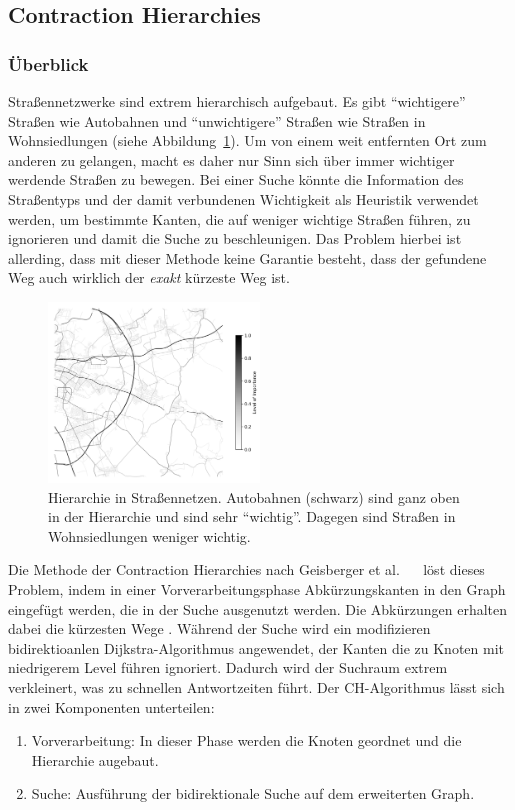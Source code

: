 \subsection{Contraction Hierarchies}
\subsubsection{Überblick}
Straßennetzwerke sind extrem hierarchisch aufgebaut. Es gibt "`wichtigere"' Straßen wie \zB Autobahnen
und "`unwichtigere"' Straßen wie \zB Straßen in Wohnsiedlungen (siehe
Abbildung~\ref{fig:road_hierarchy}). Um von einem weit entfernten Ort zum anderen zu gelangen, macht
es daher nur Sinn sich über immer wichtiger werdende Straßen zu bewegen. Bei einer Suche könnte die
Information des Straßentyps und der damit verbundenen Wichtigkeit als Heuristik verwendet werden, um
bestimmte Kanten, die auf weniger wichtige Straßen führen,  zu ignorieren und damit die Suche zu
beschleunigen. Das Problem hierbei ist allerding, dass mit dieser Methode keine Garantie besteht,
dass der gefundene Weg auch wirklich der \emph{exakt} kürzeste Weg ist.
\begin{figure}[h]
    \centering
    \includegraphics[width=0.5\textwidth]{figures/road_hierarchy.png}
    \caption[Hierarchie in Straßennetzen]{Hierarchie in Straßennetzen. Autobahnen (schwarz) sind
        ganz oben in der Hierarchie und sind sehr "`wichtig"'. Dagegen sind Straßen in
        Wohnsiedlungen weniger wichtig. \osmcr}
    \label{fig:road_hierarchy}
\end{figure}
Die Methode der Contraction Hierarchies nach Geisberger et al.
\cite{geisberger.workshop}~\cite{geisberger.thesis}~\cite{geisberger.exact} löst dieses Problem,
indem in einer Vorverarbeitungsphase Abkürzungskanten in den Graph eingefügt werden, die in der
Suche ausgenutzt werden. Die Abkürzungen erhalten dabei die kürzesten Wege \cite{Bast.20.04.2015}.
Während der Suche wird ein modifizieren bidirektioanlen Dijkstra-Algorithmus angewendet, der Kanten
die zu Knoten mit niedrigerem Level führen ignoriert. Dadurch wird der Suchraum extrem verkleinert,
was zu schnellen Antwortzeiten führt. Der CH-Algorithmus lässt sich in zwei Komponenten unterteilen:
\begin{enumerate}
    \item Vorverarbeitung: In dieser Phase werden die Knoten geordnet und die Hierarchie augebaut.
    \item Suche: Ausführung der bidirektionale Suche auf dem erweiterten Graph.
\end{enumerate}


